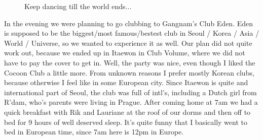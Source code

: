 \begin{post}
\begin{content}
\begin{figure}
\centering{}
\vspace{-6pt}
\caption{Keep dancing till the world ends...}
\vspace{-12pt}
\end{figure}In the evening we were planning to go clubbing to Gangnam's Club Eden. Eden is supposed to be the biggest/most famous/bestest club in Seoul / Korea / Asia / World / Universe, so we wanted to experience it as well. Our plan did not quite work out, because we ended up in Itaewon in Club Volume, where we did not have to pay the cover to get in. Well, the party was nice, even though I liked the Cocoon Club a little more. From unknown reasons I prefer mostly Korean clubs, because otherwise I feel like in some European city. Since Itaewon is quite and international part of Seoul, the club was full of intl's, including a Dutch girl from R'dam, who's parents were living in Prague. After coming home at 7am we had a quick breakfast with Rik and Lauriane at the roof of our dorms and then off to bed for 9 hours of well deserved sleep. It's quite funny that I basically went to bed in European time, since 7am here is 12pm in Europe.

\end{content}
\end{post}
